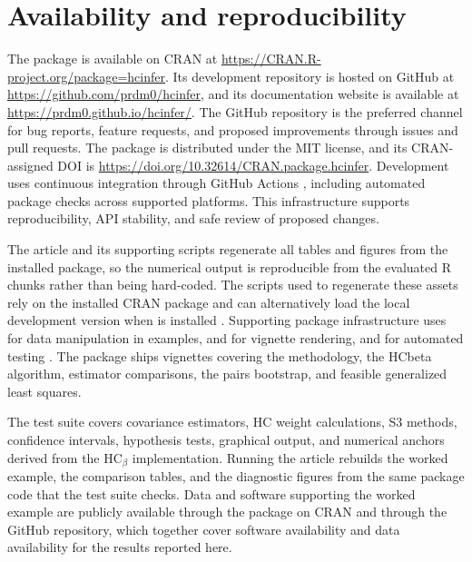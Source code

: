 \section{Availability and reproducibility}\label{availability-and-reproducibility}

The  package is available on CRAN at \url{https://CRAN.R-project.org/package=hcinfer}. Its development repository is hosted on GitHub at \url{https://github.com/prdm0/hcinfer}, and its documentation website is available at \url{https://prdm0.github.io/hcinfer/}. The GitHub repository is the preferred channel for bug reports, feature requests, and proposed improvements through issues and pull requests. The package is distributed under the MIT license, and its CRAN-assigned DOI is \url{https://doi.org/10.32614/CRAN.package.hcinfer}. Development uses continuous integration through GitHub Actions \citep{GitHubActions2026}, including automated package checks across supported platforms. This infrastructure supports reproducibility, API stability, and safe review of proposed changes.

The article and its supporting scripts regenerate all tables and figures from the installed package, so the numerical output is reproducible from the evaluated R chunks rather than being hard-coded. The scripts used to regenerate these assets rely on the installed CRAN package and can alternatively load the local development version when  is installed \citep{Pkgload2026}. Supporting package infrastructure uses  for data manipulation in examples,  and  for vignette rendering, and  for automated testing \citep{Dplyr2026, Knitr2025, Rmarkdown2026, Wickham2011Testthat}. The package ships vignettes covering the methodology, the HCbeta algorithm, estimator comparisons, the pairs bootstrap, and feasible generalized least squares.

The test suite covers covariance estimators, HC weight calculations, S3 methods, confidence intervals, hypothesis tests, graphical output, and numerical anchors derived from the \(\text{HC}_\beta\) implementation. Running the article rebuilds the worked example, the comparison tables, and the diagnostic figures from the same package code that the test suite checks. Data and software supporting the worked example are publicly available through the package on CRAN and through the GitHub repository, which together cover software availability and data availability for the results reported here.

